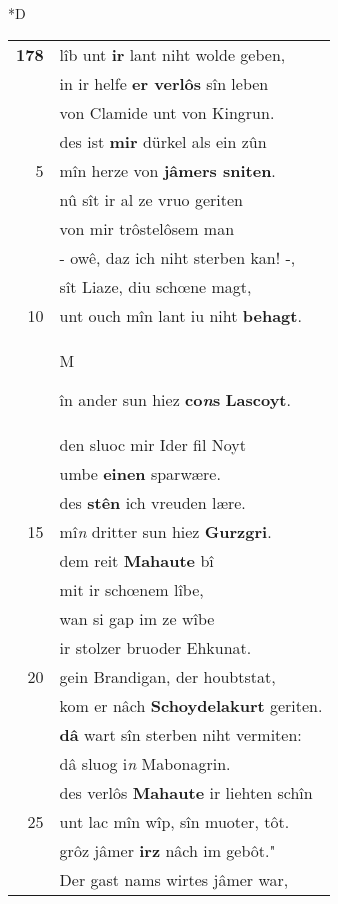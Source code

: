 \documentclass[8pt,a4paper,notitlepage]{article}
\begin{document}
\begin{table}[ht]
\begin{minipage}[t]{0.5\linewidth}
\small
\begin{center}*D
\end{center}
\begin{tabular}{rl}
\textbf{178} & lîb unt \textbf{ir} lant niht wolde geben,\\ 
 & in ir helfe \textbf{er verlôs} sîn leben\\ 
 & von Clamide unt von Kingrun.\\ 
 & des ist \textbf{mir} dürkel als ein zûn\\ 
5 & mîn herze von \textbf{jâmers sniten}.\\ 
 & nû sît ir al ze vruo geriten\\ 
 & von mir trôstelôsem man\\ 
 & - owê, daz ich niht sterben kan! -,\\ 
 & sît Liaze, diu schœne magt,\\ 
10 & unt ouch mîn lant iu niht \textbf{behagt}.\\ 
 & \begin{large}M\end{large}în ander sun hiez \textbf{co\textit{n}s} \textbf{Lascoyt}.\\ 
 & den sluoc mir Ider fil Noyt\\ 
 & umbe \textbf{einen} sparwære.\\ 
 & des \textbf{stên} ich vreuden lære.\\ 
15 & mî\textit{n} dritter sun hiez \textbf{Gurzgri}.\\ 
 & dem reit \textbf{Mahaute} bî\\ 
 & mit ir schœnem lîbe,\\ 
 & wan si gap im ze wîbe\\ 
 & ir stolzer bruoder Ehkunat.\\ 
20 & gein Brandigan, der houbtstat,\\ 
 & kom er nâch \textbf{Schoydelakurt} geriten.\\ 
 & \textbf{dâ} wart sîn sterben niht vermiten:\\ 
 & dâ sluog i\textit{n} Mabonagrin.\\ 
 & des verlôs \textbf{Mahaute} ir liehten schîn\\ 
25 & unt lac mîn wîp, sîn muoter, tôt.\\ 
 & grôz jâmer \textbf{irz} nâch im gebôt."\\ 
 & Der gast nams wirtes jâmer war,\\ 

\end{tabular}
\end{minipage}
\end{table}
\end{document}

